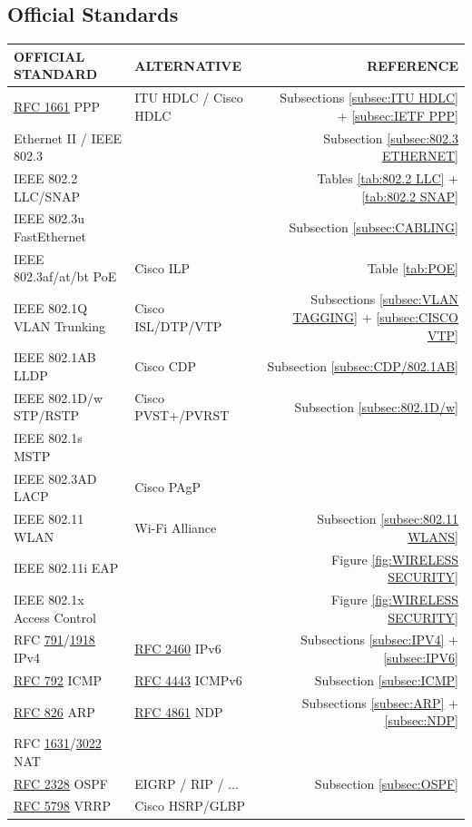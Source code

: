 \documentclass[12pt]{article}
\newcommand{\rfc}[1]{\href{https://datatracker.ietf.org/doc/html/rfc#1}{#1}}
\newcommand{\RFC}[1]{\href{https://datatracker.ietf.org/doc/html/rfc#1}{RFC #1}}
\begin{document}
	\subsection{Official Standards \label{subsec:STANDARDS}}
	\begin{table}[H]
	\centering
	\begin{tabular}{llr}
	\textbf{OFFICIAL STANDARD}	& \textbf{ALTERNATIVE}		& \textbf{REFERENCE}\\\hline
	\RFC{1661} PPP			& ITU HDLC / Cisco HDLC	& Subsections \ref{subsec:ITU HDLC} + \ref{subsec:IETF PPP}\\
	Ethernet II / IEEE 802.3		&					& Subsection \ref{subsec:802.3 ETHERNET}\\
	IEEE 802.2 LLC/SNAP		&					& Tables \ref{tab:802.2 LLC} + \ref{tab:802.2 SNAP}\\
	IEEE 802.3u FastEthernet		&					& Subsection \ref{subsec:CABLING}\\
	IEEE 802.3af/at/bt PoE		& Cisco ILP				& Table \ref{tab:POE}\\\hline
	IEEE 802.1Q VLAN Trunking	& Cisco ISL/DTP/VTP		& Subsections \ref{subsec:VLAN TAGGING} + \ref{subsec:CISCO VTP}\\
	IEEE 802.1AB LLDP		& Cisco CDP			& Subsection \ref{subsec:CDP/802.1AB}\\
	IEEE 802.1D/w STP/RSTP		& Cisco PVST+/PVRST		& Subsection \ref{subsec:802.1D/w}\\
	IEEE 802.1s MSTP			&					&\\
	IEEE 802.3AD LACP		& Cisco PAgP			&\\\hline
	IEEE 802.11 WLAN			& Wi-Fi Alliance			& Subsection \ref{subsec:802.11 WLANS}\\
	IEEE 802.11i EAP			& 					&Figure \ref{fig:WIRELESS SECURITY}\\
	IEEE 802.1x Access Control	&					& Figure \ref{fig:WIRELESS SECURITY}\\\hline
	RFC \rfc{791}/\rfc{1918} IPv4	& \RFC{2460} IPv6		& Subsections \ref{subsec:IPV4} + \ref{subsec:IPV6}\\
	\RFC{792} ICMP			& \RFC{4443} ICMPv6		& Subsection \ref{subsec:ICMP}\\
	\RFC{826} ARP			& \RFC{4861} NDP		& Subsections \ref{subsec:ARP} + \ref{subsec:NDP}\\
	RFC \rfc{1631}/\rfc{3022} NAT	&					&\\
	\RFC{2328} OSPF			& EIGRP / RIP / ...			& Subsection \ref{subsec:OSPF}\\
	\RFC{5798} VRRP			& Cisco HSRP/GLBP		&\\

\end{tabular}
\end{table}
\end{document}
